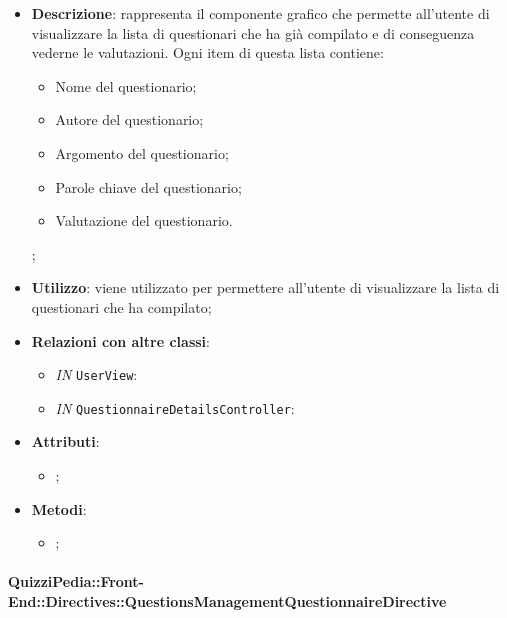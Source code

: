 \begin{itemize}
	\item \textbf{Descrizione}: rappresenta il componente grafico che permette all'utente di visualizzare la lista di questionari che ha già compilato e di conseguenza vederne le valutazioni. Ogni item di questa lista contiene:
	\begin{itemize}
		\item Nome del questionario;
		\item Autore del questionario;
		\item Argomento del questionario;
		\item Parole chiave del questionario;
		\item Valutazione del questionario.
	\end{itemize};
	\item \textbf{Utilizzo}: viene utilizzato per permettere all'utente di visualizzare la lista di questionari che ha compilato;
	\item \textbf{Relazioni con altre classi}: 
	\begin{itemize}
		\item \textit{IN} \texttt{UserView}: 
		\item \textit{IN} \texttt{QuestionnaireDetailsController}: 
	\end{itemize}
	\item \textbf{Attributi}: 
	\begin{itemize}
		\item ;
	\end{itemize}
	\item \textbf{Metodi}: 
	\begin{itemize}
		\item ;
	\end{itemize}
\end{itemize}

\paragraph{QuizziPedia::Front-End::Directives::QuestionsManagementQuestionnaireDirective}

\label{QuizziPedia::Front-End::Directives::QuestionsManagementQuestionnaireDirective}

